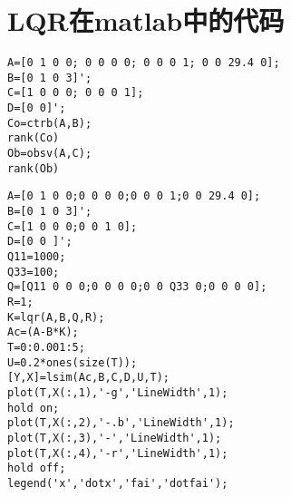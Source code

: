 \chapter{LQR在matlab中的代码}
\label{cha:engorg}
\begin{lstlisting}
A=[0 1 0 0; 0 0 0 0; 0 0 0 1; 0 0 29.4 0];
B=[0 1 0 3]';
C=[1 0 0 0; 0 0 0 1];
D=[0 0]';
Co=ctrb(A,B);
rank(Co)
Ob=obsv(A,C);
rank(Ob)
\end{lstlisting}

\begin{lstlisting}
A=[0 1 0 0;0 0 0 0;0 0 0 1;0 0 29.4 0];
B=[0 1 0 3]';
C=[1 0 0 0;0 0 1 0];
D=[0 0 ]';
Q11=1000;
Q33=100;
Q=[Q11 0 0 0;0 0 0 0;0 0 Q33 0;0 0 0 0];
R=1;
K=lqr(A,B,Q,R);
Ac=(A-B*K);
T=0:0.001:5;
U=0.2*ones(size(T));
[Y,X]=lsim(Ac,B,C,D,U,T);
plot(T,X(:,1),'-g','LineWidth',1);
hold on;
plot(T,X(:,2),'-.b','LineWidth',1);
plot(T,X(:,3),'-','LineWidth',1);
plot(T,X(:,4),'-r','LineWidth',1);
hold off;
legend('x','dotx','fai','dotfai');
\end{lstlisting}